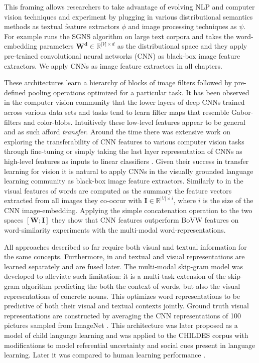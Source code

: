 This framing allows researchers to take advantage of evolving NLP and computer vision techniques
and experiment by plugging in various distributional semantics methods as textual feature extractors
$\phi$ and image processing techniques as $\psi$.
For example \cite{kiela2014learning} runs the SGNS algorithm
on large text corpora and takes the word-embedding parameters
$\mathbf{W^d} \in \mathbb{R}^{|V| \times d}$ as the distributional space and
they apply pre-trained convolutional neural networks (CNN) as black-box image
feature extractors. We apply CNNs as image feature extractors in all chapters.

These architectures learn a hierarchy of blocks of image filters followed by
pre-defined pooling operations optimized for a particular task.
It has been observed in the computer vision community that the lower layers of
deep CNNs trained across various data sets and tasks tend to learn filter maps
that resemble Gabor-filters and color-blobs. Intuitively these low-level features appear to be general
and as such afford \emph{transfer}. Around the time there was extensive work on exploring the transferability
of CNN features to various computer vision tasks through fine-tuning
 \citep{donahue2014decaf,oquab2014learning} or simply taking the last layer representation of CNNs
as high-level features as inputs to linear classifiers \citep{girshick2014rich,sharif2014cnn}.
Given their success in transfer learning for vision it is natural to apply CNNs in the
visually grounded language learning community as black-box image feature extractors.
Similarly to \cite{bruni2014multimodal} in
\cite{kiela2014learning} the visual features of words are computed as the summary the feature vectors
extracted from all images they co-occur with $\mathbf{I} \in \mathbb{R}^{|V| \times i}$, where $i$ is
the size of the CNN image-embedding.
Applying the simple concatenation operation to the two spaces $[\mathbf{W};\mathbf{I}]$
they show that CNN features outperform BoVW features on word-similarity
experiments with the multi-modal word-representations.

All approaches described so far require both visual and textual information for the same concepts.
Furthermore, in \citep{bruni2014multimodal} and \citep{kiela2014learning} textual and visual
representations are learned separately and are fused later.
The multi-modal skip-gram \cite{lazaridou2015combining} model was developed to alleviate such limitation:
it is a multi-task extension of the skip-gram algorithm predicting the both the context of words, but also
the visual representations of concrete nouns. This optimizes word representations to be predictive of
both their visual and textual contexts jointly. Ground truth visual representations are constructed by averaging
the CNN representations \cite{krizhevsky2012imagenet} of 100 pictures sampled from ImageNet \cite{deng2009imagenet}.
This architecture was later proposed as a model of child language learning and
was applied to the CHILDES corpus \cite{macwhinney2014childes} with modifications to model referential
uncertainty and social cues \cite{lazaridou2016multimodal} present in language learning.
Later it was compared to human learning performance \cite{lazaridou2017multimodal}.


